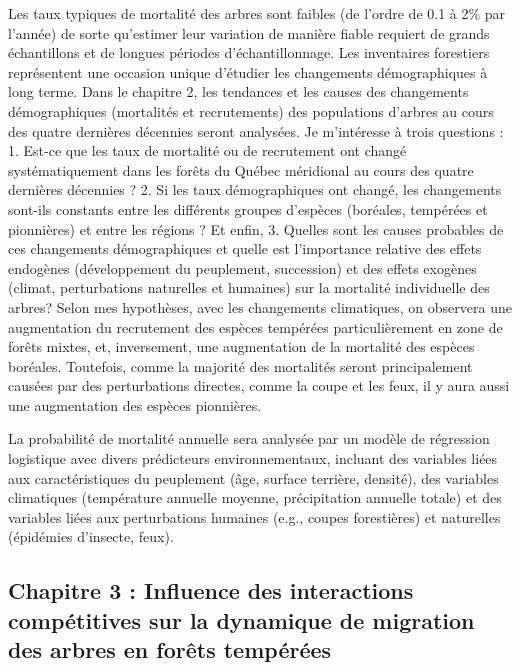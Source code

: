 Les taux typiques de mortalité des arbres sont faibles (de l'ordre de
0.1 à 2\% par l'année) de sorte qu'estimer leur variation de manière
fiable requiert de grands échantillons et de longues périodes
d'échantillonnage. Les inventaires forestiers représentent une occasion
unique d'étudier les changements démographiques à long terme. Dans le
chapitre 2, les tendances et les causes des changements démographiques
(mortalités et recrutements) des populations d'arbres au cours des
quatre dernières décennies seront analysées. Je m'intéresse à trois
questions : 1. Est-ce que les taux de mortalité ou de recrutement ont
changé systématiquement dans les forêts du Québec méridional au cours
des quatre dernières décennies ? 2. Si les taux démographiques ont
changé, les changements sont-ils constants entre les différents groupes
d'espèces (boréales, tempérées et pionnières) et entre les régions ? Et
enfin, 3. Quelles sont les causes probables de ces changements
démographiques et quelle est l'importance relative des effets endogènes
(développement du peuplement, succession) et des effets exogènes
(climat, perturbations naturelles et humaines) sur la mortalité
individuelle des arbres? Selon mes hypothèses, avec les changements
climatiques, on observera une augmentation du recrutement des espèces
tempérées particulièrement en zone de forêts mixtes, et, inversement,
une augmentation de la mortalité des espèces boréales. Toutefois, comme
la majorité des mortalités seront principalement causées par des
perturbations directes, comme la coupe et les feux, il y aura aussi une
augmentation des espèces pionnières.

La probabilité de mortalité annuelle sera analysée par un modèle de
régression logistique avec divers prédicteurs environnementaux, incluant
des variables liées aux caractéristiques du peuplement (âge, surface
terrière, densité), des variables climatiques (température annuelle
moyenne, précipitation annuelle totale) et des variables liées aux
perturbations humaines (e.g., coupes forestières) et naturelles
(épidémies d'insecte, feux).

\hypertarget{chapitre-3-influence-des-interactions-compuxe9titives-sur-la-dynamique-de-migration-des-arbres-en-foruxeats-tempuxe9ruxe9es}{%
\subsection{Chapitre 3 : Influence des interactions compétitives sur la
dynamique de migration des arbres en forêts
tempérées}\label{chapitre-3-influence-des-interactions-compuxe9titives-sur-la-dynamique-de-migration-des-arbres-en-foruxeats-tempuxe9ruxe9es}}

